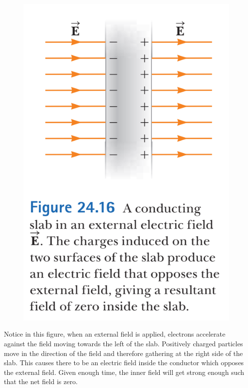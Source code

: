 \documentclass[12pt, titlepage, oneside]{article}
\begin{document}
\noindent
\begin{figure}
	\begin{center}
		\includegraphics[scale=0.5]{8.PNG}
	\end{center}
\end{figure}
Notice in this figure, when an external field is applied, electrons accelerate against the field moving towards the left of the slab. Positively charged particles move in the direction of the field and therefore gathering at the right side of the slab. This causes there to be an electric field inside the conductor which opposes the external field. Given enough time, the inner field will get strong enough such that the net field is zero. 
\\
\end{document}
